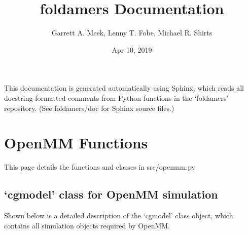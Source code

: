 \documentclass[letterpaper,10pt,english]{sphinxmanual}
\title{foldamers Documentation}
\date{Apr 10, 2019}
\author{Garrett A. Meek, Lenny T. Fobe, Michael R. Shirts}
\begin{document}
\pagestyle{empty}
\sphinxmaketitle
\pagestyle{plain}
\sphinxtableofcontents
\pagestyle{normal}
\label{\detokenize{index::doc}}


This documentation is generated automatically using Sphinx, which reads
all docstring-formatted comments from Python functions in
the ‘foldamers’ repository.  (See foldamers/doc for Sphinx
source files.)


\chapter{OpenMM Functions}
\label{\detokenize{openmm:openmm-functions}}\label{\detokenize{openmm::doc}}
This page details the functions and classes in src/openmm.py


\section{‘cgmodel’ class for OpenMM simulation}
\label{\detokenize{openmm:cgmodel-class-for-openmm-simulation}}
Shown below is a detailed description of the ‘cgmodel’ class object,
which contains all simulation objects required by OpenMM.

\label{\detokenize{openmm:module-openmm}}
\end{document}
